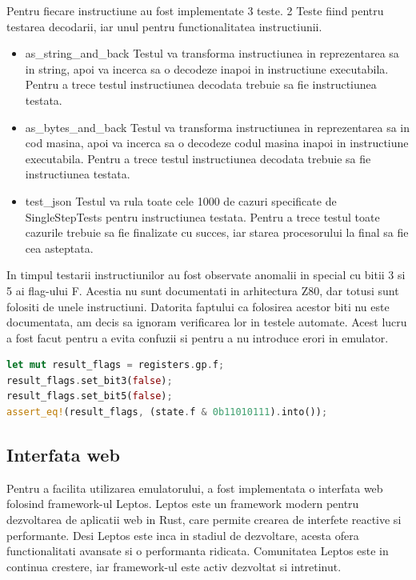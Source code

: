 \documentclass[titlepage,12pt]{article}
\DeclareRobustCommand{\code}[1]{{\ttfamily\small #1}}
\begin{document}
Pentru fiecare instructiune au fost implementate 3 teste. 2 Teste fiind pentru testarea decodarii, iar unul pentru functionalitatea instructiunii.

\begin{itemize}
\item {\code{as\_string\_and\_back}} Testul va transforma instructiunea in reprezentarea sa in string, apoi va incerca sa o decodeze inapoi in instructiune executabila. Pentru a trece testul instructiunea decodata trebuie sa fie instructiunea testata.
\item {\code{as\_bytes\_and\_back}} Testul va transforma instructiunea in reprezentarea sa in cod masina, apoi va incerca sa o decodeze codul masina inapoi in instructiune executabila. Pentru a trece testul instructiunea decodata trebuie sa fie instructiunea testata.
\item {\code{test\_json}} Testul va rula toate cele 1000 de cazuri specificate de SingleStepTests \cite {ref:singlesteptestsz80} pentru instructiunea testata. Pentru a trece testul toate cazurile trebuie sa fie finalizate cu succes, iar starea procesorului la final sa fie cea asteptata.
\end{itemize}

In timpul testarii instructiunilor au fost observate anomalii in special cu bitii 3 si 5 ai flag-ului F. Acestia nu sunt documentati in arhitectura Z80, dar totusi sunt folositi de unele instructiuni. Datorita faptului ca folosirea acestor biti nu este documentata, am decis sa ignoram verificarea lor in testele automate. Acest lucru a fost facut pentru a evita confuzii si pentru a nu introduce erori in emulator.

\begin{lstlisting}[language=Rust,caption={Ignorarea bitilor nedocumentati din testare},label={lst:testingignore35flags}]
let mut result_flags = registers.gp.f;
result_flags.set_bit3(false);
result_flags.set_bit5(false);
assert_eq!(result_flags, (state.f & 0b11010111).into());
\end{lstlisting}
\subsection{Interfata web}

Pentru a facilita utilizarea emulatorului, a fost implementata o interfata web folosind framework-ul Leptos. Leptos este un framework modern pentru dezvoltarea de aplicatii web in Rust, care permite crearea de interfete reactive si performante. Desi Leptos este inca in stadiul de dezvoltare, acesta ofera functionalitati avansate si o performanta ridicata. Comunitatea Leptos este in continua crestere, iar framework-ul este activ dezvoltat si intretinut.
\end{document}
